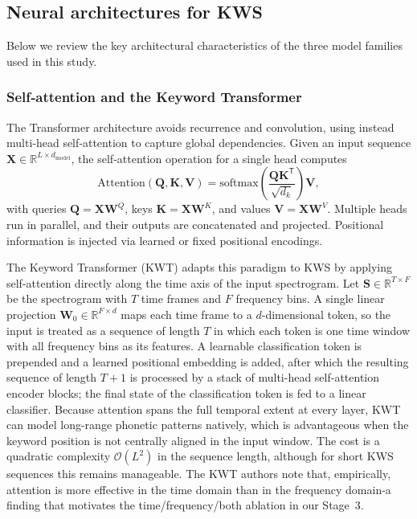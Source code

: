 \documentclass[11pt]{article}
\begin{document}
\subsection{Neural architectures for KWS}
Below we review the key architectural characteristics of the three model families used in this study.

\subsubsection{Self‑attention and the Keyword Transformer}
The Transformer architecture \cite{vaswani} avoids recurrence and convolution, using instead multi‑head self‑attention to capture global dependencies. 
Given an input sequence $\mathbf{X} \in \mathbb{R}^{L \times d_{\text{model}}}$, the self‑attention operation for a single head computes
\begin{equation}
    \text{Attention}(\mathbf{Q}, \mathbf{K}, \mathbf{V}) = \text{softmax}\!\left(\frac{\mathbf{Q} \mathbf{K}^{\mathsf{T}}}{\sqrt{d_k}}\right) \mathbf{V},
\end{equation}
with queries $\mathbf{Q} = \mathbf{X} \mathbf{W}^Q$, keys $\mathbf{K} = \mathbf{X} \mathbf{W}^K$, and values $\mathbf{V} = \mathbf{X} \mathbf{W}^V$. 
Multiple heads run in parallel, and their outputs are concatenated and projected. 
Positional information is injected via learned or fixed positional encodings.

The Keyword Transformer (KWT) \cite{kwt} adapts this paradigm to KWS by applying self-attention directly along the time axis of the input spectrogram.
Let $\mathbf{S} \in \mathbb{R}^{T \times F}$ be the spectrogram with $T$ time frames and $F$ frequency bins.
A single linear projection $\mathbf{W}_0 \in \mathbb{R}^{F \times d}$ maps each time frame to a $d$-dimensional token, so the input is treated as a sequence of length $T$ in which each token is one time window with all frequency bins as its features.
A learnable classification token is prepended and a learned positional embedding is added, after which the resulting sequence of length $T+1$ is processed by a stack of multi-head self-attention encoder blocks; the final state of the classification token is fed to a linear classifier.
Because attention spans the full temporal extent at every layer, KWT can model long-range phonetic patterns natively, which is advantageous when the keyword position is not centrally aligned in the input window.
The cost is a quadratic complexity $\mathcal{O}(L^2)$ in the sequence length, although for short KWS sequences this remains manageable.
The KWT authors note that, empirically, attention is more effective in the time domain than in the frequency domain-a finding that motivates the time/frequency/both ablation in our Stage~3.
\end{document}
